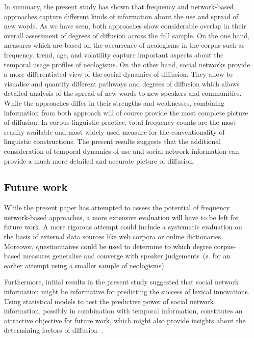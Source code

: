 \documentclass[
  a4paper,
  abstract=on,
  captions=tableabove
  ]{scrartcl}
\begin{document}
    In summary, the present study has shown that frequency and network-based approaches capture different kinds of information about the use and spread of new words. As we have seen, both approaches show considerable overlap in their overall assessment of degrees of diffusion across the full sample. On the one hand, measures which are based on the occurrence of neologisms in the corpus such as frequency, trend, age, and volatility capture important aspects about the temporal usage profiles of neologisms. On the other hand, social networks provide a more differentiated view of the social dynamics of diffusion. They allow to visualise and quantify different pathways and degrees of diffusion which allows detailed analysis of the spread of new words to new speakers and communities. While the approaches differ in their strengths and weaknesses, combining information from both approach will of course provide the most complete picture of diffusion. In corpus-linguistic practice, total frequency counts are the most readily available and most widely used measure for the conventionality of linguistic constructions. The present results suggests that the additional consideration of temporal dynamics of use and social network information can provide a much more detailed and accurate picture of diffusion.


  \subsection{Future work}
  
    While the present paper has attempted to assess the potential of frequency network-based approaches, a more extensive evaluation will have to be left for future work. A more rigorous attempt could include a systematic evaluation on the basis of external data sources like web corpora or online dictionaries. Moreover, questionnaires could be used to determine to which degree corpus-based measures generalise and converge with speaker judgements~(s. \cite{Kerremans2015WebNew} for an earlier attempt using a smaller sample of neologisms).

    Furthermore, initial results in the present study suggested that social network information might be informative for predicting the success of lexical innovations. Using statistical models to test the predictive power of social network information, possibly in combination with temporal information, constitutes an attractive objective for future work, which might also provide insights about the determining factors of diffusion~\parencite{Ryskina2020WhereNew, Stewart2018MakingFetch}.  
\end{document}
